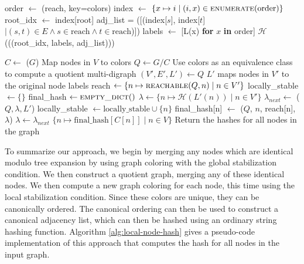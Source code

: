 \documentclass[twoside,leqno]{article}
\begin{document}
\begin{algorithm*}[!b]
    \caption{Local Digraph Node Hash}\label{alg:local-node-hash}
    \begin{algorithmic}[1]

        \State order $\gets$ (reach, key=colors)
        \State index $\gets$ $\{x \mapsto i \mid (i, x) \in \textproc{enumerate}(\text{order})\}$
        \State root\_idx $\gets$ index[root]
        \State adj\_list = ([(index[$s$], index[$t$] $\mid (s, t) \in E \land s \in \text{reach} \land t \in \text{reach}$)])
        \State labels $\gets$ [L(x) \textbf{for} $x$ \textbf{in} order]
        \State \Return $\mathcal{H}$(((root\_idx, labels, adj\_list)))
    \EndFunction

        \State $C \gets$ ($G$) \Comment Map nodes in $V$ to colors
        \State $Q \gets G / C$ \Comment Use colors as an equivalence class to compute a quotient multi-digraph
        \State $(V', E', L') \gets Q$ \Comment $L'$ maps nodes in $V'$ to the original node labels
        \State reach $\gets \{n \mapsto \textproc{reachable}(Q, n) \mid n \in V'\}$
        \State locally\_stable $\gets \{\}$
        \State final\_hash $\gets \textproc{empty\_dict}()$
        \State $\lambda \gets \{n \mapsto \mathcal{H}(L'(n)) \mid n \in V'\}$
          \State $\lambda_{next} \gets$ ($Q, \lambda, L'$)
                \State locally\_stable $\gets \text{locally\_stable} \cup \{n\}$
                \State final\_hash[n] $\gets$ ($Q$, $n$, reach[n], $\lambda$)
              \EndIf
            \EndIf
          \EndFor
          \State $\lambda \gets \lambda_{next}$
        \EndWhile
        \State \Return $\{n \mapsto \text{final\_hash}[C[n]] \mid n \in V\}$ \Comment Return the hashes for all nodes in the graph
    \EndFunction
    \end{algorithmic}
\end{algorithm*}

To summarize our approach, we begin by merging any nodes which are identical modulo tree expansion by using graph coloring with the global stabilization condition. We then construct a quotient graph, merging any of these identical nodes. We then compute a new graph coloring for each node, this time using the local stabilization condition. Since these colors are unique, they can be canonically ordered. The canonical ordering can then be used to construct a canonical adjacency list, which can then be hashed using an ordinary string hashing function. Algorithm \ref{alg:local-node-hash} gives a pseudo-code implementation of this approach that computes the hash for all nodes in the input graph.
\end{document}
